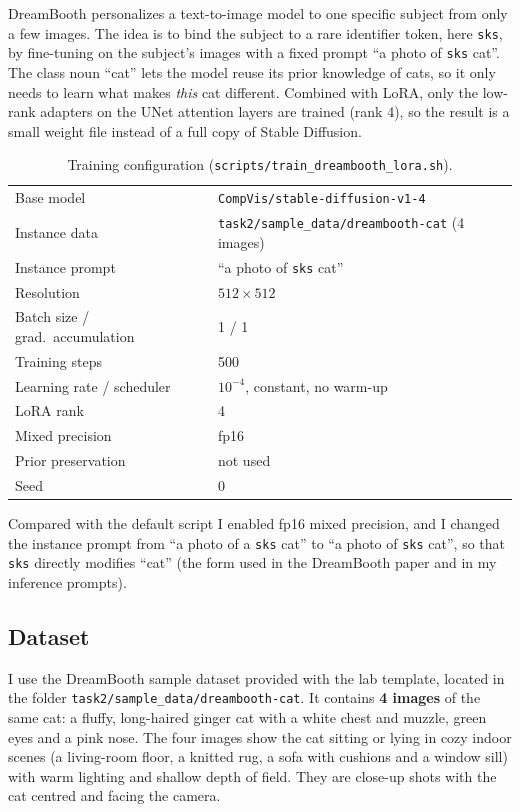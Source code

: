 \documentclass[a4paper]{article} %
\begin{document}
DreamBooth personalizes a text-to-image model to one specific subject from only a few images. The
idea is to bind the subject to a rare identifier token, here \texttt{sks}, by fine-tuning on the
subject's images with a fixed prompt ``a photo of \texttt{sks} cat''. The class noun ``cat'' lets
the model reuse its prior knowledge of cats, so it only needs to learn what makes \emph{this} cat
different. Combined with LoRA, only the low-rank adapters on the UNet attention layers are trained
(rank 4), so the result is a small weight file instead of a full copy of Stable Diffusion.

\begin{table}[H]
\centering
\caption{Training configuration (\texttt{scripts/train\_dreambooth\_lora.sh}).}
\label{tab:db_cfg}
\begin{tabular}{ll}
\toprule
Base model & \texttt{CompVis/stable-diffusion-v1-4} \\
Instance data & \texttt{task2/sample\_data/dreambooth-cat} (4 images) \\
Instance prompt & ``a photo of \texttt{sks} cat'' \\
Resolution & $512\times512$ \\
Batch size / grad.\ accumulation & 1 / 1 \\
Training steps & 500 \\
Learning rate / scheduler & $10^{-4}$, constant, no warm-up \\
LoRA rank & 4 \\
Mixed precision & fp16 \\
Prior preservation & not used \\
Seed & 0 \\
\bottomrule
\end{tabular}
\end{table}

Compared with the default script I enabled fp16 mixed precision, and I changed the instance prompt
from ``a photo of a \texttt{sks} cat'' to ``a photo of \texttt{sks} cat'', so that \texttt{sks}
directly modifies ``cat'' (the form used in the DreamBooth paper and in my inference prompts).

\subsection{Dataset}

I use the DreamBooth sample dataset provided with the lab template, located in the folder
\texttt{task2/sample\_data/dreambooth-cat}. It contains \textbf{4 images} of the same cat: a fluffy,
long-haired ginger cat with a white chest and muzzle, green eyes and a pink nose. The four images
show the cat sitting or lying in cozy indoor scenes (a living-room floor, a knitted rug, a sofa with
cushions and a window sill) with warm lighting and shallow depth of field. They are close-up shots
with the cat centred and facing the camera.
\end{document}

